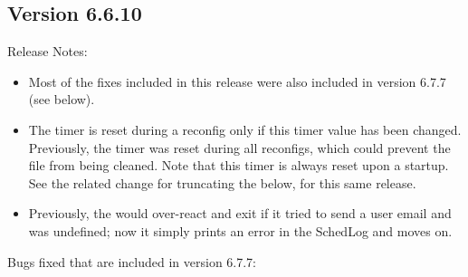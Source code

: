 \subsection{\label{sec:New-6-6-10}Version 6.6.10}

\noindent Release Notes:

\begin{itemize}

\item Most of the fixes included in this release were also included in
  version 6.7.7 (see below).

\item The  timer is reset during a 
 reconfig only if this timer value has been changed.
Previously, the timer was reset during all  reconfigs, which
could prevent the  file from being cleaned.  Note that
this timer is always reset upon a  startup.  See the
related change for truncating the  below, for this same
release.

\item Previously, the  would over-react and exit if it
tried to send a user email and  was undefined;
now it simply prints an error in the SchedLog and moves on.

\end{itemize}

%
%
%

\noindent Bugs fixed that are included in version 6.7.7:

